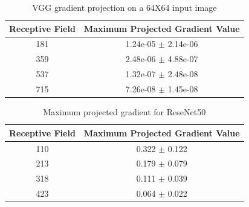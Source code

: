 \begin{table}[H]
\begin{tabular}{@{}cc@{}}
\toprule
\textbf{Receptive Field} & \textbf{Maximum Projected Gradient Value} \\ \midrule
181                      & 1.24e-05 $\pm$ 2.14e-06                   \\
359                      & 2.48e-06 $\pm$ 4.88e-07                   \\
537                      & 1.32e-07 $\pm$ 2.48e-08                   \\
715                      & 7.26e-08 $\pm$ 1.45e-08                   \\ \bottomrule
\end{tabular}
\caption{VGG gradient projection on a 64X64 input image}
\label{tab:vgg_grad_projection}
\end{table}
\begin{table}[H]
\begin{tabular}{@{}cc@{}}
\toprule
\textbf{Receptive Field} & \textbf{Maximum Projected Gradient Value} \\ \midrule
110                      & 0.322 $\pm$ 0.122                         \\
213                      & 0.179 $\pm$ 0.079                         \\
318                      & 0.111 $\pm$ 0.039                         \\
423                      & 0.064 $\pm$ 0.022                         \\ \bottomrule
\end{tabular}
\caption{Maximum projected gradient for ReseNet50}
\label{tab:resnet50_grad_projection}
\end{table}

%
%
%
%
%
%





%

